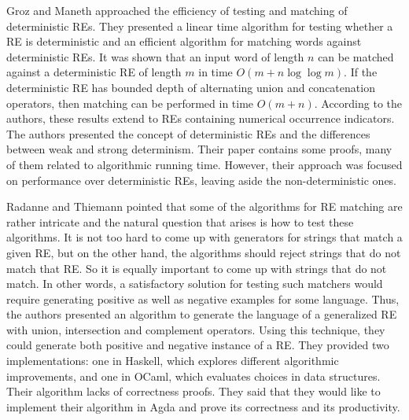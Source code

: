 \documentclass[oneside,12pt]{scrbook}
\theoremstyle{definition}
\theoremstyle{plain}
\theoremstyle{definition}
\begin{document}
Groz and Maneth \cite{Groz2017} approached the efficiency of testing and matching of deterministic REs. They presented a linear time algorithm for testing whether a RE is deterministic and an efficient algorithm for matching words against deterministic REs. It was shown that an input word of length $n$ can be matched against a deterministic RE of length $m$ in time $O (m + n  \log \log m)$. If the deterministic RE has bounded depth of alternating union and concatenation operators, then matching can be performed in time $O (m + n)$. According to the authors, these results extend to REs containing numerical occurrence indicators. The authors presented the concept of deterministic REs and the differences between weak and strong determinism. Their paper contains some proofs, many of them related to algorithmic running time. However, their approach was focused on performance over deterministic REs, leaving aside the non-deterministic ones.

Radanne and Thiemann \cite{radanne:hal-01788827} pointed that some of the algorithms for RE matching are rather intricate and the natural question that arises is how to test these algorithms. It is not too hard to come up with generators for strings that match a given RE, but on the other hand, the algorithms should reject strings that do not match that RE. So it is equally important to come up with strings that do not match. In other words, a satisfactory solution for testing such matchers would require generating positive as well as negative examples for some language. Thus, the authors presented an algorithm to generate the language of a generalized RE with union, intersection and complement operators. Using this technique, they could generate both positive and negative instance of a RE. They provided two implementations: one in Haskell, which explores different algorithmic improvements, and one in OCaml, which evaluates choices in data structures. Their algorithm lacks of correctness proofs. They said that they would like to implement their algorithm in Agda and prove its correctness and its productivity.


\end{document}
